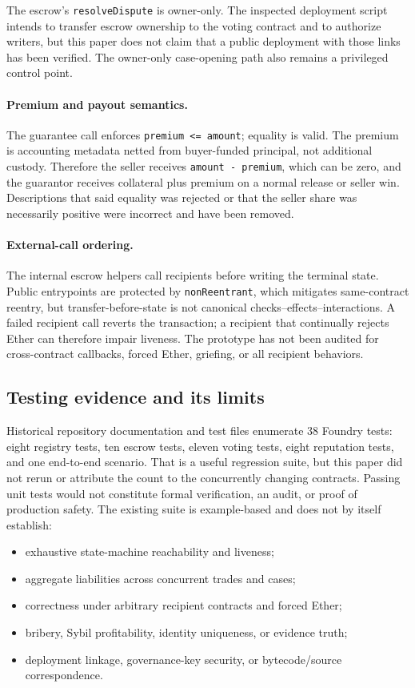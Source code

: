 The escrow's \texttt{resolveDispute} is owner-only. The inspected deployment script intends to
transfer escrow ownership to the voting contract and to authorize writers, but this paper does not
claim that a public deployment with those links has been verified. The owner-only case-opening path
also remains a privileged control point.

\paragraph{Premium and payout semantics.}
The guarantee call enforces \texttt{premium <= amount}; equality is valid. The premium is accounting
metadata netted from buyer-funded principal, not additional custody. Therefore the seller receives
\texttt{amount - premium}, which can be zero, and the guarantor receives collateral plus premium on a
normal release or seller win. Descriptions that said equality was rejected or that the seller share
was necessarily positive were incorrect and have been removed.

\paragraph{External-call ordering.}
The internal escrow helpers call recipients before writing the terminal state. Public entrypoints are
protected by \texttt{nonReentrant}, which mitigates same-contract reentry, but transfer-before-state is
not canonical checks--effects--interactions. A failed recipient call reverts the transaction; a
recipient that continually rejects Ether can therefore impair liveness. The prototype has not been
audited for cross-contract callbacks, forced Ether, griefing, or all recipient behaviors.

\subsection{Testing evidence and its limits}
\label{sec:testing}

Historical repository documentation and test files enumerate 38 Foundry tests: eight registry tests,
ten escrow tests, eleven voting tests, eight reputation tests, and one end-to-end scenario. That is a
useful regression suite, but this paper did not rerun or attribute the count to the concurrently
changing contracts. Passing unit tests would not constitute formal verification, an audit, or proof
of production safety. The existing suite is example-based and does not by itself establish:
\begin{itemize}[leftmargin=2em,itemsep=1pt]
  \item exhaustive state-machine reachability and liveness;
  \item aggregate liabilities across concurrent trades and cases;
  \item correctness under arbitrary recipient contracts and forced Ether;
  \item bribery, Sybil profitability, identity uniqueness, or evidence truth;
  \item deployment linkage, governance-key security, or bytecode/source correspondence.
\end{itemize}

